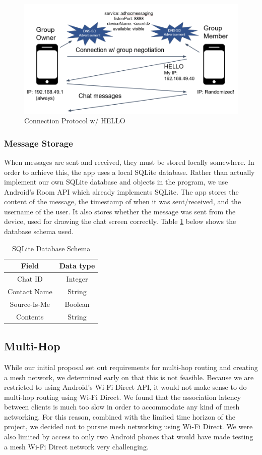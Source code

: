 \documentclass[10pt]{article}
\begin{document}
\begin{figure}[h]
    \centering
    \includegraphics[width=5in]{proto.png}
    \caption{Connection Protocol w/ HELLO}
    \label{backend:proto}
\end{figure}

\subsubsection{Message Storage}
When messages are sent and received, they must be stored locally somewhere. In order to achieve this, the app uses a local SQLite database. Rather than actually implement our own SQLite database and objects in the program, we use Android's Room API which already implements SQLite. The app stores the content of the message, the timestamp of when it was sent/received, and the username of the user. It also stores whether the message was sent from the device, used for drawing the chat screen correctly. Table \ref{backend:sqlite} below shows the database schema used. 
\begin{table}[h]
    \begin{center}
    \begin{tabular}{|c|c|} \hline
        Field & Data type \\ \hline
        Chat ID & Integer \\
        Contact Name & String \\
        Source-Is-Me & Boolean \\
        Contents & String \\ \hline
    \end{tabular}
    \end{center}
    \caption{SQLite Database Schema}
    \label{backend:sqlite}
\end{table}


\subsection{Multi-Hop}
While our initial proposal set out requirements for multi-hop routing and creating a mesh network, we determined early on that this is not feasible. Because we are restricted to using Android's Wi-Fi Direct API, it would not make sense to do multi-hop routing using Wi-Fi Direct. We found that the association latency between clients is much too slow in order to accommodate any kind of mesh networking. For this reason, combined with the limited time horizon of the project, we decided not to pursue mesh networking using Wi-Fi Direct. We were also limited by access to only two Android phones that would have made testing a mesh Wi-Fi Direct network very challenging.
\end{document}
